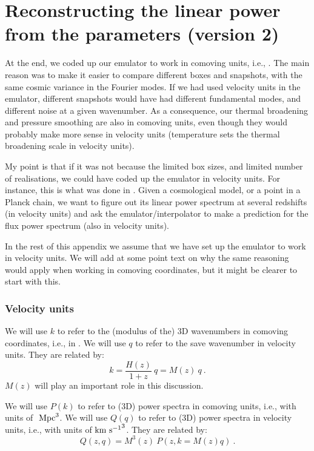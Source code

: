 \section{Reconstructing the linear power from the parameters (version 2)} 
\label{app:linP_approx}

At the end, we coded up our emulator to work in comoving units, i.e., \Mpc.
The main reason was to make it easier to compare different boxes and snapshots,
with the same cosmic variance in the Fourier modes. 
If we had used velocity units in the emulator, different snapshots would have
had different fundamental modes, and different noise at a given wavenumber.
As a consequence, our thermal broadening and pressure smoothing are also
in comoving units, even though they would probably make more sense in velocity
units (temperature sets the thermal broadening scale in velocity units).

My point is that if it was not because the limited box sizes, and limited
number of realisations, we could have coded up the emulator in velocity units.
For instance, this is what was done in \cite{McDonald2005a}.
Given a cosmological model, or a point in a Planck chain, we want to figure
out its linear power spectrum at several redshifts (in velocity units) and
ask the emulator/interpolator to make a prediction for the flux power spectrum
(also in velocity units).

In the rest of this appendix we assume that we have set up the emulator to
work in velocity units. 
We will add at some point text on why the same reasoning would apply when
working in comoving coordinates, but it might be clearer to start with this.


\subsubsection{Velocity units}

We will use $k$ to refer to the (modulus of the) 3D wavenumbers in comoving
coordinates, i.e., in \Mpc. 
We will use $q$ to refer to the save wavenumber in velocity units. 
They are related by:
\begin{equation}
 k = \frac{H(z)}{1+z} ~ q = M(z) ~ q ~.
\end{equation}
$M(z)$ will play an important role in this discussion.

We will use $P(k)$ to refer to (3D) power spectra in comoving units, i.e.,
with units of $\ \text{Mpc}^3$.
We will use $Q(q)$ to refer to (3D) power spectra in velocity units, i.e.,
with units of ${\rm km~s^{-1}}^3$.
They are related by:
\begin{equation}
 Q(z,q) = M^3(z) ~ P(z,k=M(z)q) ~.
\end{equation}


